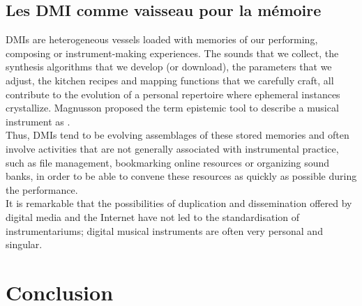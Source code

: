 \subsection{Les DMI comme vaisseau pour la mémoire}
\label{sec:ephemeral:vessels}
DMIs are heterogeneous vessels loaded with memories of our performing, composing or instrument-making experiences. The sounds that we collect, the synthesis algorithms that we develop (or download), the parameters that we adjust, the kitchen recipes and mapping functions that we carefully craft, all contribute to the evolution of a personal repertoire where ephemeral instances crystallize. Magnusson proposed the term epistemic tool to describe a musical instrument as  \cite{magnusson_epistemic_2009}.\\
\indent Thus, DMIs tend to be evolving assemblages of these stored memories and often involve activities that are not generally associated with instrumental practice, such as file management, bookmarking online resources or organizing sound banks, in order to be able to convene these resources as quickly as possible during the performance.\\
\indent It is remarkable that the possibilities of duplication and dissemination offered by digital media and the Internet have not led to the standardisation of instrumentariums; digital musical instruments are often very personal and singular.

\section{Conclusion}

